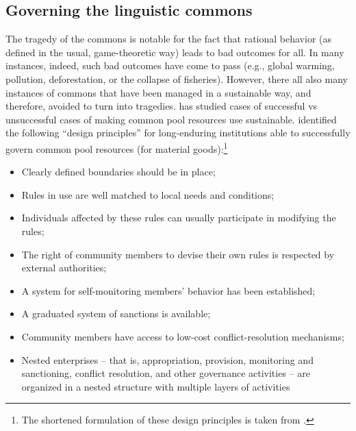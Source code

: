 \documentclass[output=paper,hidelinks]{langscibook}
\begin{document}
\subsection{Governing the linguistic commons}\largerpage
\label{sec:govern-ling-comm}

The tragedy of the commons is notable for the fact that rational behavior (as defined in the usual, game-theoretic way) leads to bad outcomes for all. In many instances, indeed, such bad outcomes have come to pass (e.g., global warming, pollution, deforestation, or the collapse of fisheries). However, there all also many instances of commons that have been managed in a sustainable way, and therefore, avoided to turn into tragedies. \citet{ostrom90} has studied cases of successful vs unsuccessful cases of making common pool resources use sustainable. \citet[90--102]{ostrom90} identified the following ``design principles'' for long-enduring institutions able to successfully govern common pool resources (for material goods):\footnote{The shortened formulation of these design principles is taken from \citet[7]{hessostrom07a}.}

\begin{itemize}
  \item Clearly defined boundaries should be in place;
  \item Rules in use are well matched to local needs and conditions; 
  \item Individuals affected by these rules can usually participate in modifying the rules;
  \item The right of community members to devise their own rules is respected by external authorities;
  \item A system for self-monitoring members' behavior has been established;
  \item A graduated system of sanctions is available;
  \item Community members have access to low-cost conflict-resolution mechanisms;
  \item Nested enterprises -- that is, appropriation, provision, monitoring and sanctioning, conflict resolution, and other governance activities -- are organized in a nested structure with multiple layers of activities
\end{itemize}
\end{document}
